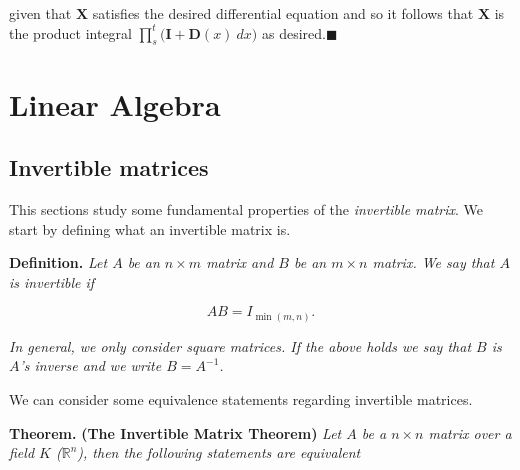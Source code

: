 \documentclass[a4paper,12pt,openany]{book}
\begin{document}
given that \(\mathbf{X}\) satisfies the desired differential equation and so it follows that \(\mathbf{X}\) is the product integral \(\prod_{s}^t\big(\mathbf{I}+\mathbf{D}(x)\ dx\big)\) as desired.\(\blacksquare\)

\hypertarget{linear-algebra}{%
\chapter{Linear Algebra}\label{linear-algebra}}

\hypertarget{invertible-matrices}{%
\section{Invertible matrices}\label{invertible-matrices}}

This sections study some fundamental properties of the \emph{invertible matrix}. We start by defining what an invertible matrix is.

\textbf{Definition.} \emph{Let \(A\) be an \(n\times m\) matrix and \(B\) be an \(m\times n\) matrix. We say that \(A\) is invertible if}

\[
AB=I_{\min(m,n)}.
\]

\emph{In general, we only consider square matrices. If the above holds we say that \(B\) is \(A\)'s inverse and we write \(B=A^{-1}\).}

We can consider some equivalence statements regarding invertible matrices.

\textbf{Theorem.} \textbf{(The Invertible Matrix Theorem)} \emph{Let \(A\) be a \(n\times n\) matrix over a field \(K\) (\(\mathbb{R}^n\)), then the following statements are equivalent}
\end{document}
